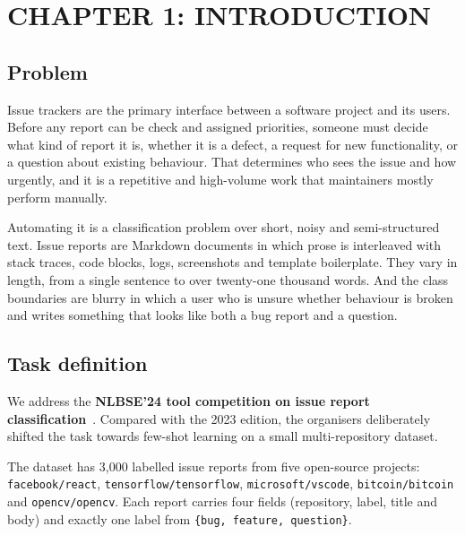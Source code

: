 \section*{CHAPTER 1: INTRODUCTION}
\setcounter{section}{1}
\setcounter{subsection}{0}
\setcounter{figure}{0}
\setcounter{table}{0}

\subsection{Problem}

Issue trackers are the primary interface between a software project and its
users. Before any report can be check and assigned priorities, someone must decide what kind of report it is, whether it is a defect, a request for new functionality, or a question about existing behaviour. That determines who sees the issue and how urgently, and it is a repetitive and high-volume work that maintainers mostly perform manually.

Automating it is a classification problem over short, noisy and semi-structured text. Issue reports are Markdown documents in which prose is interleaved with stack traces, code blocks, logs, screenshots and template boilerplate. They vary in length, from a single sentence to over twenty-one
thousand words. And the class boundaries are blurry in which a user who is
unsure whether behaviour is broken and writes something that looks like both a bug report and a question.

\subsection{Task definition}

We address the \textbf{NLBSE'24 tool competition on issue report classification}~\cite{nlbse2024}.
Compared with the 2023 edition, the organisers deliberately shifted the task towards
few-shot learning on a small multi-repository dataset.

\noindent The dataset has 3,000 labelled issue reports from five open-source projects:
\texttt{facebook/react}, \texttt{tensorflow/tensorflow}, \texttt{microsoft/vscode}, \texttt{bitcoin/bitcoin} and \texttt{opencv/opencv}.
Each report carries four fields (repository, label, title and body) and exactly one
label from \texttt{\{bug, feature, question\}}.


